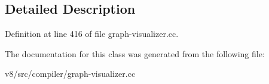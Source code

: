 \subsection{Detailed Description}


Definition at line 416 of file graph-\/visualizer.\+cc.



The documentation for this class was generated from the following file\+:\begin{DoxyCompactItemize}
\item 
v8/src/compiler/graph-\/visualizer.\+cc\end{DoxyCompactItemize}
